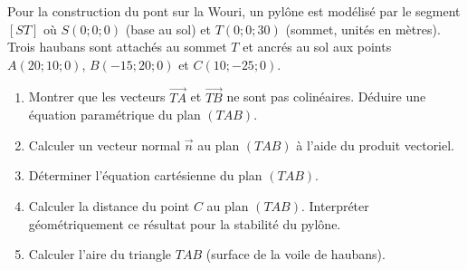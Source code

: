 \documentclass[11pt]{article}
\begin{document}
\begin{exercice}
Pour la construction du pont sur la Wouri, un pylône est modélisé par le segment $[ST]$ où $S(0;0;0)$ (base au sol) et $T(0;0;30)$ (sommet, unités en mètres). Trois haubans sont attachés au sommet $T$ et ancrés au sol aux points $A(20;10;0)$, $B(-15;20;0)$ et $C(10;-25;0)$.
\begin{enumerate}
    \item Montrer que les vecteurs $\overrightarrow{TA}$ et $\overrightarrow{TB}$ ne sont pas colinéaires. Déduire une équation paramétrique du plan $(TAB)$.
    \item Calculer un vecteur normal $\vec n$ au plan $(TAB)$ à l'aide du produit vectoriel.
    \item Déterminer l'équation cartésienne du plan $(TAB)$.
    \item Calculer la distance du point $C$ au plan $(TAB)$. Interpréter géométriquement ce résultat pour la stabilité du pylône.
    \item Calculer l'aire du triangle $TAB$ (surface de la voile de haubans).
\end{enumerate}
\end{exercice}
\end{document}
